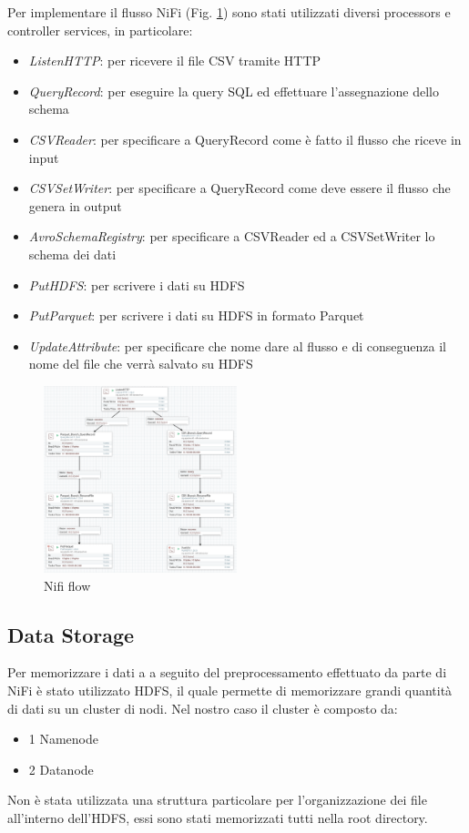 \documentclass[conference]{IEEEtran}
\begin{document}
Per implementare il flusso NiFi (Fig. \ref{fig:nifi_flow}) sono stati utilizzati diversi processors e controller services, in particolare:
\begin{itemize}
    \item \textit{ListenHTTP}: per ricevere il file CSV tramite HTTP
    \item \textit{QueryRecord}: per eseguire la query SQL ed effettuare l'assegnazione dello schema
    \item \textit{CSVReader}: per specificare a QueryRecord come è fatto il flusso che riceve in input
    \item \textit{CSVSetWriter}: per specificare a QueryRecord come deve essere il flusso che genera in output
    \item \textit{AvroSchemaRegistry}: per specificare a CSVReader ed a CSVSetWriter lo schema dei dati
    \item \textit{PutHDFS}: per scrivere i dati su HDFS
    \item \textit{PutParquet}: per scrivere i dati su HDFS in formato Parquet
    \item \textit{UpdateAttribute}: per specificare che nome dare al flusso e di conseguenza il nome del file che verrà salvato su HDFS
\end{itemize}
\begin{figure}[H]
    \centering
    \includegraphics[width=0.5\textwidth]{./res/nifi_flow.png}
    \caption{Nifi flow}
    \label{fig:nifi_flow}
\end{figure} 
\subsection{Data Storage}
Per memorizzare i dati a a seguito del preprocessamento effettuato da parte di NiFi è stato utilizzato HDFS, il quale permette di memorizzare grandi quantità di dati su un cluster di nodi. Nel nostro caso il cluster è composto da:
\begin{itemize}
    \item 1 Namenode
    \item 2 Datanode
\end{itemize}
Non è stata utilizzata una struttura particolare per l'organizzazione dei file all'interno dell'HDFS, essi sono stati memorizzati tutti nella root directory.
\end{document}

